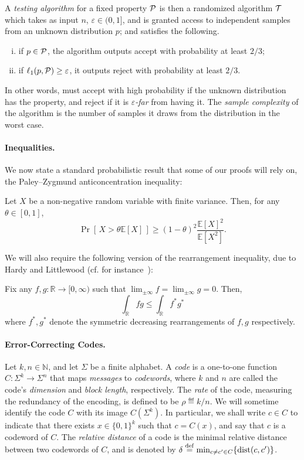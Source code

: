\documentclass[11pt]{article}
\theoremstyle{remark}   	\newtheorem{remark}[theorem]{Remark}
\theoremstyle{definition}   	\newaliascnt{defn}{theorem}
\newcommand{\eps}{\ensuremath{\varepsilon}\xspace}
\newcommand{\accept}{\textsf{accept}\xspace}
\newcommand{\reject}{\textsf{reject}\xspace}
\newcommand{\distop}{\operatorname{dist}}
\newcommand{\dist}[2]{\distop\mleft({#1, #2}\mright)}
\newcommand{\proba}{\Pr}
\newcommand{\probaOf}[1]{\proba\!\left[\, #1\, \right]}
\newcommand{\expect}[1]{\mathbb{E}\!\left[#1\right]}
\newcommand{\R}{\ensuremath{\mathbb{R}}\xspace}
\newcommand{\N}{\ensuremath{\mathbb{N}}\xspace}
\newcommand{\lp}[1][1]{\ell_{#1}}
\newcommand{\bitset}{\ensuremath{\{0,1\}}}
\begin{document}
A \emph{testing algorithm} for a fixed property $\mathcal{P}$ is then a randomized algorithm $\mathcal{T}$ which takes as input $n$, $\eps\in(0,1]$, and is granted access to independent samples from an unknown distribution $p$; and satisfies the following.
\begin{enumerate}[(i)]
\item if $p \in \mathcal{P}$, the algorithm outputs \accept with probability at least $2/3$;
\item if $\lp[1](p,\property) \geq \eps$, it outputs \reject with probability at least $2/3$.
\end{enumerate}
In other words, \Tester must accept with high probability if the unknown distribution has the property, and reject if it is \emph{\eps-far} from having it. The  \emph{sample complexity} of the algorithm is the number of samples it draws from the distribution in the worst case.

\paragraph{Inequalities.}
We now state a standard probabilistic result that some of our proofs will rely on, the Paley--Zygmund anticoncentration inequality:
\begin{theorem}\label{theo:paley:zigmund}
  Let $X$ be a non-negative random variable with finite variance. Then, for any $\theta\in[0,1]$,
  \[
      \probaOf{ X > \theta\expect{X} } \geq (1-\theta)^2\frac{\expect{X}^2}{\expect{X^2}}.
  \]
\end{theorem}

We will also require the following version of the rearrangement inequality, due to Hardy and Littlewood (cf. for instance~\cite[Theorem 2.2]{BennettS:88}):
  \begin{theorem}\label{theo:hardy:littlewood}
    Fix any $f,g\colon\R\to [0,\infty)$ such that $\lim_{\pm\infty} f = \lim_{\pm\infty} g = 0$. Then,
    \[
        \int_{\R} fg \leq \int_{\R} f^\ast g^\ast
    \]
    where $f^\ast, g^\ast$ denote the symmetric decreasing rearrangements of $f,g$ respectively.
  \end{theorem}

\paragraph{Error-Correcting Codes.} Let $k,n\in\N$, and let $\Sigma$ be a finite alphabet. A \emph{code} is a one-to-one function $C\colon\Sigma^k \to \Sigma^n$ that maps \emph{messages} to \emph{codewords}, where $k$ and $n$ are called the code's \emph{dimension} and \emph{block length}, respectively. The \emph{rate} of the code, measuring the redundancy of the encoding, is defined to be $\rho \eqdef k/n$. We will sometime identify the code $C$ with its image $C(\Sigma^k)$. In particular, we shall write $c \in C$ to indicate that there exists $x\in\bitset^k$ such that $c = C(x)$, and say that $c$ is a codeword of $C$.  The \emph{relative distance} of a code is the minimal relative distance between two codewords of $C$, and is denoted by $\delta \eqdef \min_{c \neq c' \in C}\{\dist{c}{c'}\}$. 
\end{document}
